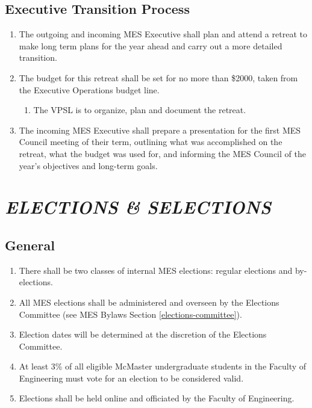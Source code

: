 \hypertarget{executive-transition-process}{%
 \subsection{Executive Transition
  Process}
 \label{executive-transition-process}}
\begin{enumerate}
 \item
  The outgoing and incoming MES Executive shall plan and attend a
  retreat to make long term plans for the year ahead and carry out a
  more detailed transition.
 \item
  The budget for this retreat shall be set for no more than \$2000,
  taken from the Executive Operations budget line.

  \begin{enumerate}
   \item
    The VPSL is to organize, plan and document the retreat.
  \end{enumerate}
 \item
  The incoming MES Executive shall prepare a presentation for the first
  MES Council meeting of their term, outlining what was accomplished on
  the retreat, what the budget was used for, and informing the MES
  Council of the year's objectives and long-term goals.
\end{enumerate}


\hypertarget{elections-selections}{%
 \section{\texorpdfstring{\emph{ELECTIONS \&
     SELECTIONS}}{ELECTIONS \& SELECTIONS}}
 \label{elections-selections}}
\hypertarget{elections-general}{%
 \subsection{General}
 \label{elections-general}}
\begin{enumerate}
 \item
  There shall be two classes of internal MES elections: regular
  elections and by-elections.
 \item
  All MES elections shall be administered and overseen by the Elections
  Committee (see MES Bylaws Section \ref{elections-committee}).
 \item
  Election dates will be determined at the discretion of the Elections
  Committee.
 \item
  At least 3\% of all eligible McMaster undergraduate students in the
  Faculty of Engineering must vote for an election to be considered
  valid.
 \item
  Elections shall be held online and officiated by the Faculty of
  Engineering.

\end{enumerate}

